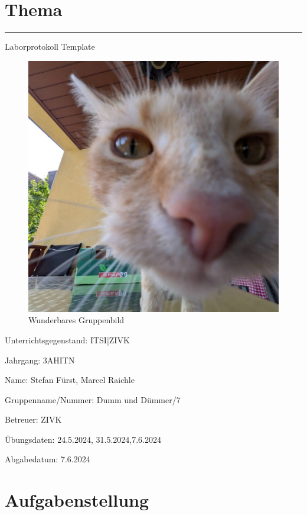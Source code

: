 \documentclass[a4paper]{article}
\begin{document}

\pagestyle{oida}
\section*{Thema}
\par\noindent\rule{\textwidth}{0.4pt}

Laborprotokoll
Template

\begin{figure}[h]
	\includegraphics[scale=0.3]{images/mika.jpeg}
	\caption{Wunderbares Gruppenbild}
\end{figure}

\vspace*{\fill}
Unterrichtsgegenstand:	ITSI|ZIVK

Jahrgang:	3AHITN

Name:	Stefan Fürst, Marcel Raichle

Gruppenname/Nummer: Dumm und Dümmer/7

Betreuer: 	ZIVK

Übungsdaten:	24.5.2024, 31.5.2024,7.6.2024

Abgabedatum:	7.6.2024


\newpage
\tableofcontents

\newpage

\section{Aufgabenstellung}
\end{document}
